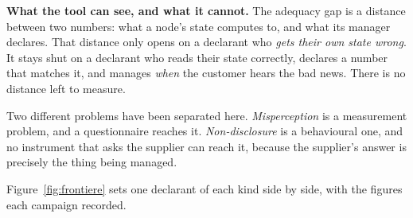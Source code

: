 \begin{definitionBox}
\noindent\textbf{What the tool can see, and what it cannot.} The adequacy gap is a distance
between two numbers: what a node's state computes to, and what its manager declares. That
distance only opens on a declarant who \emph{gets their own state wrong}. It stays shut on a
declarant who reads their state correctly, declares a number that matches it, and manages
\emph{when} the customer hears the bad news. There is no distance left to measure.

\medskip

\noindent Two different problems have been separated here. \emph{Misperception} is a
measurement problem, and a questionnaire reaches it. \emph{Non-disclosure} is a behavioural
one, and no instrument that asks the supplier can reach it, because the supplier's answer is
precisely the thing being managed.
\end{definitionBox}

Figure~\ref{fig:frontiere} sets one declarant of each kind side by side, with the figures each
campaign recorded.


